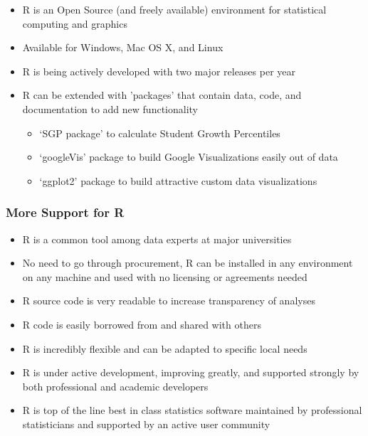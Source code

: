 \documentclass[12pt,handout]{beamer}
\begin{document}
\begin{frame}
  \begin{itemize}
  \item R is an Open Source (and freely available) environment for statistical computing and graphics
  \item Available for Windows, Mac OS X, and Linux
  \item R is being actively developed with two major releases per year
  \item R can be extended with 'packages' that contain data, code, and documentation to add new functionality
    \begin{itemize}
    \item `SGP package' to calculate Student Growth Percentiles
    \item `googleVis' package to build Google Visualizations easily out of data
    \item `ggplot2' package to build attractive custom data visualizations
    \end{itemize}
  \end{itemize}
\end{frame}

\begin{frame}
\frametitle{More Support for R}
  \begin{itemize}
  \item R is a common tool among data experts at major universities
  \item No need to go through procurement, R can be installed in any environment on any machine and used with no licensing or agreements needed
  \item R source code is very readable to increase transparency of analyses
  \item R code is easily borrowed from and shared with others
  \item R is incredibly flexible and can be adapted to specific local needs
  \item R is under active development, improving greatly, and supported strongly by both professional and academic developers
  \item R is top of the line best in class statistics software maintained by professional statisticians and supported by an active user community
  \end{itemize}
\end{frame}
\end{document}
